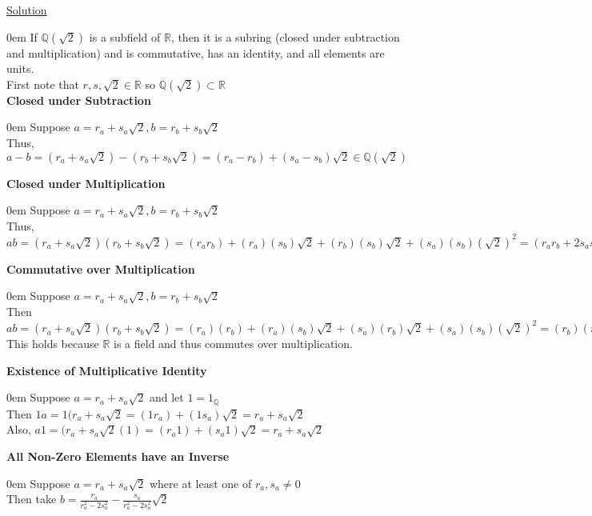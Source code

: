 \documentclass{article} %
\begin{document}
\underline{Solution}
\begin{addmargin}[1em]{0em}
If $\mathbb{Q}(\sqrt{2})$ is a subfield of $\mathbb{R}$, then it is a subring (closed under subtraction and multiplication) and is commutative, has an identity, and all elements are units.
\\First note that $r, s, \sqrt{2} \in \mathbb{R}$ so $\mathbb{Q}(\sqrt{2}) \subset \mathbb{R}$
\\ \textbf{Closed under Subtraction}
\begin{addmargin}[1em]{0em}
Suppose $a = r_a + s_a\sqrt{2}, b = r_b + s_b\sqrt{2}$
\\Thus, $a - b = (r_a + s_a\sqrt{2}) - (r_b + s_b\sqrt{2}) = (r_a - r_b) + (s_a - s_b)\sqrt{2} \in \mathbb{Q}(\sqrt{2})$
\end{addmargin}
\textbf{Closed under Multiplication}
\begin{addmargin}[1em]{0em}
Suppose $a = r_a + s_a\sqrt{2}, b = r_b + s_b\sqrt{2}$
\\Thus, $ab = (r_a + s_a\sqrt{2})(r_b + s_b\sqrt{2}) = (r_ar_b) + (r_a)(s_b)\sqrt{2} + (r_b)(s_b)\sqrt{2} + (s_a)(s_b)(\sqrt{2})^2 = (r_ar_b + 2s_as_b) + (r_as_b + r_bs_a)\sqrt{2} \in \mathbb{Q}(\sqrt{2})$
\end{addmargin}
\textbf{Commutative over Multiplication}
\begin{addmargin}[1em]{0em}
Suppose $a = r_a + s_a\sqrt{2}, b = r_b + s_b\sqrt{2}$
\\Then $ab = (r_a + s_a\sqrt{2})(r_b + s_b\sqrt{2}) = (r_a)(r_b) + (r_a)(s_b)\sqrt{2} + (s_a)(r_b)\sqrt{2} + (s_a)(s_b)(\sqrt{2})^2 = (r_b)(r_a) + (r_b)(s_a)\sqrt{2} + (s_b)(r_a)\sqrt{2} + (s_b)(s_a)(\sqrt{2})^2 = (r_b + s_b\sqrt{2})(r_a + s_a\sqrt{2}) = ba$
\\This holds because $\mathbb{R}$ is a field and thus commutes over multiplication.
\end{addmargin}
\textbf{Existence of Multiplicative Identity}
\begin{addmargin}[1em]{0em}
Suppose $a = r_a + s_a\sqrt{2}$ and let $1 = 1_\mathbb{Q}$
\\Then $1a = 1(r_a + s_a\sqrt{2} = (1r_a) + (1s_a)\sqrt{2} = r_a + s_a\sqrt{2}$
\\Also, $a1 = (r_a + s_a\sqrt{2}(1) = (r_a1) + (s_a1)\sqrt{2} = r_a + s_a\sqrt{2}$
\end{addmargin}
\textbf{All Non-Zero Elements have an Inverse}
\begin{addmargin}[1em]{0em}
Suppose $a = r_a + s_a\sqrt{2}$ where at least one of $r_a, s_a \neq 0$
\\Then take $b = \frac{r_a}{r_a^2-2s_a^2} - \frac{s_a}{r_a^2-2s_a^2}\sqrt{2}$

\end{addmargin}
\end{addmargin}
\end{document}
